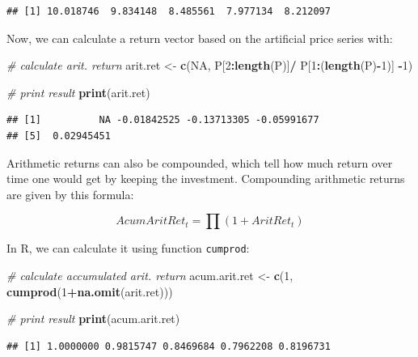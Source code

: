 \documentclass[11pt,]{book}
\newenvironment{Shaded}{\begin{snugshade}}{\end{snugshade}}
\newcommand{\KeywordTok}[1]{\textcolor[rgb]{0.27,0.27,0.27}{\textbf{#1}}}
\newcommand{\DecValTok}[1]{\textcolor[rgb]{0.06,0.06,0.06}{#1}}
\newcommand{\StringTok}[1]{\textcolor[rgb]{0.5,0.5,0.5}{#1}}
\newcommand{\CommentTok}[1]{\textcolor[rgb]{0.56,0.35,0.01}{\textit{#1}}}
\newcommand{\OtherTok}[1]{\textcolor[rgb]{0.56,0.35,0.01}{#1}}
\newcommand{\OperatorTok}[1]{\textcolor[rgb]{0.81,0.36,0.00}{\textbf{#1}}}
\newcommand{\NormalTok}[1]{#1}
\begin{document}
\begin{verbatim}
## [1] 10.018746  9.834148  8.485561  7.977134  8.212097
\end{verbatim}

Now, we can calculate a return vector based on the artificial price
series with:

\begin{Shaded}
\begin{Highlighting}[]
\CommentTok{# calculate arit. return}
\NormalTok{arit.ret <-}\StringTok{ }\KeywordTok{c}\NormalTok{(}\OtherTok{NA}\NormalTok{, P[}\DecValTok{2}\OperatorTok{:}\KeywordTok{length}\NormalTok{(P)]}\OperatorTok{/}
\StringTok{                  }\NormalTok{P[}\DecValTok{1}\OperatorTok{:}\NormalTok{(}\KeywordTok{length}\NormalTok{(P)}\OperatorTok{-}\DecValTok{1}\NormalTok{)] }\OperatorTok{-}\DecValTok{1}\NormalTok{)}
                  
\CommentTok{# print result}
\KeywordTok{print}\NormalTok{(arit.ret)}
\end{Highlighting}
\end{Shaded}

\begin{verbatim}
## [1]          NA -0.01842525 -0.13713305 -0.05991677
## [5]  0.02945451
\end{verbatim}

Arithmetic returns can also be compounded, which tell how much return
over time one would get by keeping the investment. Compounding
arithmetic returns are given by this formula:

\[AcumAritRet_t = \prod\left (1+AritRet _t \right ) \]

In R, we can calculate it using function \texttt{cumprod}:

\begin{Shaded}
\begin{Highlighting}[]
\CommentTok{# calculate accumulated arit. return}
\NormalTok{acum.arit.ret <-}\StringTok{ }\KeywordTok{c}\NormalTok{(}\DecValTok{1}\NormalTok{, }\KeywordTok{cumprod}\NormalTok{(}\DecValTok{1}\OperatorTok{+}\KeywordTok{na.omit}\NormalTok{(arit.ret)))}
                  
\CommentTok{# print result}
\KeywordTok{print}\NormalTok{(acum.arit.ret)}
\end{Highlighting}
\end{Shaded}

\begin{verbatim}
## [1] 1.0000000 0.9815747 0.8469684 0.7962208 0.8196731
\end{verbatim}
\end{document}
